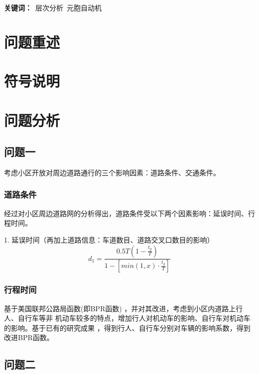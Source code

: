 \documentclass[fontset=windows,a4paper,12pt]{ctexart}
\begin{document}
  \begin{center}
  \end{center}
  \linespread{1.2}
  \begin{center}
  \end{center}
  \textbf{关键词：}\ 层次分析\ 元胞自动机
  
  \section{问题重述}
  \section{符号说明}
  \section{问题分析}
	\subsection{问题一}
		考虑小区开放对周边道路通行的三个影响因素：道路条件、交通条件。
		\subsubsection{道路条件}
			经过对小区周边道路网的分析得出，道路条件受以下两个因素影响：延误时间、行程时间。

			1. 延误时间（再加上道路信息：车道数目、道路交叉口数目的影响）
			\begin{equation}
				d_1=\frac{0.5T(1-\frac{t_g}{T})}{1-[min(1,x)\cdot{\frac{t_g}{T}}]}
			\end{equation}
		\subsubsection{行程时间}
			基于美国联邦公路局函数(即BPR函数) ，并对其改进，考虑到小区内道路上行人、自行车等非
			机动车较多的特点，增加行人对机动车的影响、自行车对机动车的影响。基于已有的研究成果
			，得到行人、自行车分别对车辆的影响系数，得到改进BPR函数。
	\subsection{问题二}
  \newpage
  
  
\end{document}
